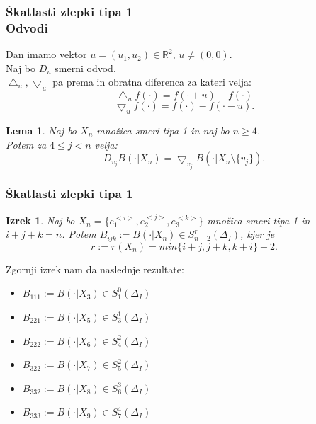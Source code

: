 \documentclass{beamer}
\newtheorem{izrek}{Izrek}
\newtheorem{lema}{Lema}
\begin{document}
\begin{frame}
\frametitle{Škatlasti zlepki tipa 1 \\ Odvodi}

Dan imamo vektor $u = (u_1, u_2) \in \mathbb{R}^2$, $u \neq (0,0)$. \\
Naj bo $D_u$ smerni odvod, \\
$\bigtriangleup_u, \bigtriangledown_u$ pa prema in obratna diferenca za kateri velja:
$$\bigtriangleup_u f(\cdot) = f(\cdot + u) - f(\cdot)$$
$$\bigtriangledown_u f(\cdot) = f(\cdot) - f(\cdot - u).$$


\begin{lema}
\label{lema1}
Naj bo $X_n$ množica smeri tipa 1 in naj bo $n\geq 4$.\\
Potem za $4 \leq j < n$ velja:
$$D_{v_j} B(\cdot|X_n) = \bigtriangledown_{v_j} B(\cdot | X_n \setminus \{v_j\}).$$
\end{lema}
\end{frame}

\begin{frame}
\frametitle{Škatlasti zlepki tipa 1}

\begin{izrek}
Naj bo $X_n = \{e_1^{<i>},e_2^{<j>}, e_3^{<k>}\}$ množica smeri tipa 1 in $i+j+k = n$.
Potem $B_{ijk} := B(\cdot | X_n) \in S_{n-2}^r (\Delta_I)$, kjer je $$r := r(X_n) = min\{i+j, j+k, k+i\} -2.$$
\end{izrek}

\vspace{3mm}
\pause

Zgornji izrek nam da naslednje rezultate:
\begin{itemize}
\item $B_{111} := B(\cdot | X_3) \in S_{1}^0 (\Delta_I)$
\item $B_{221} := B(\cdot | X_5) \in S_{3}^1 (\Delta_I)$
\item $B_{222} := B(\cdot | X_6) \in S_{4}^2 (\Delta_I)$
\item $B_{322} := B(\cdot | X_7) \in S_{5}^2 (\Delta_I)$
\item $B_{332} := B(\cdot | X_8) \in S_{6}^3 (\Delta_I)$
\item $B_{333} := B(\cdot | X_9) \in S_{7}^4 (\Delta_I)$
\end{itemize}

\end{frame}
\end{document}
